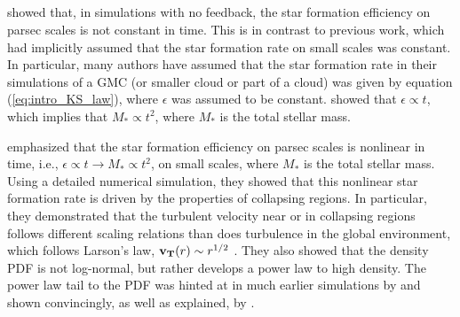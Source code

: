 \documentclass[../dissertation.tex]{subfiles}
\begin{document}

%
%

\subsection{\citet{2015ApJ...800...49L}} \label{Lee15_model}

\citet{2015ApJ...800...49L} showed that, in simulations with no feedback, the star formation efficiency on
parsec scales is not constant in time.
This is in contrast to previous work, which had implicitly assumed that the star formation rate on small scales was constant.
In particular, many authors have assumed that the star formation rate in their simulations of a GMC (or smaller cloud or part of a cloud) was given by equation (\ref{eq:intro_KS_law}), where $\epsilon$ was assumed to be constant.
\citet{2015ApJ...800...49L} showed that $\epsilon \propto t$, which implies that $M_* \propto t^2$, where $M_*$ is the total stellar mass.

\citet{2015ApJ...800...49L} emphasized that the star formation efficiency on 
parsec scales is nonlinear 
in time, i.e., $\epsilon \propto t \rightarrow M_* \propto t^2$, on small scales, where $M_*$ is the total stellar mass. 
Using a detailed numerical simulation, they showed that this nonlinear star formation 
rate is driven by the properties of collapsing regions.
In particular, they demonstrated that the turbulent velocity near or in collapsing regions follows 
different scaling relations than does turbulence in the global environment, which follows
Larson's law, $\mathbf{v_T} (r)\sim r^{1/2}$ \citep{1981MNRAS.194..809L}. 
They also showed that the density PDF 
is not log-normal, but rather develops a power law to high density.
The power law tail to the  PDF  was hinted at in much earlier simulations by \citet{2000ApJ...535..869K} and shown convincingly, 
as well as explained, by \citet{2011ApJ...727L..20K}. 
\end{document}
